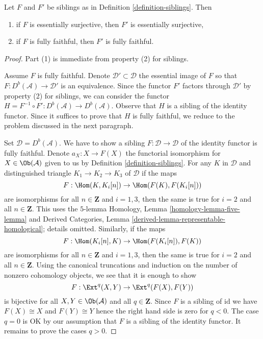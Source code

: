 \begin{lemma}
\label{lemma-sibling-faithful}
Let $F$ and $F'$ be siblings as in Definition \ref{definition-siblings}.
Then
\begin{enumerate}
\item if $F$ is essentially surjective, then $F'$ is essentially
surjective,
\item if $F$ is fully faithful, then $F'$ is fully faithful.
\end{enumerate}
\end{lemma}

\begin{proof}
Part (1) is immediate from property (2) for siblings.

\medskip\noindent
Assume $F$ is fully faithful. Denote $\mathcal{D}' \subset \mathcal{D}$
the essential image of $F$ so that $F : D^b(\mathcal{A}) \to \mathcal{D}'$
is an equivalence. Since the functor $F'$ factors through $\mathcal{D}'$
by property (2) for siblings, we can consider the functor
$H = F^{-1} \circ F' : D^b(\mathcal{A}) \to D^b(\mathcal{A})$.
Observe that $H$ is a sibling of the identity functor.
Since it suffices to prove that $H$ is fully faithful,
we reduce to the problem discussed in the next paragraph.

\medskip\noindent
Set $\mathcal{D} = D^b(\mathcal{A})$. We have to show a sibling
$F : \mathcal{D} \to \mathcal{D}$ of the identity functor is fully faithful.
Denote $a_X : X \to F(X)$ the functorial isomorphism for
$X \in \Ob(\mathcal{A})$ given to us by Definition \ref{definition-siblings}.
For any $K$ in $\mathcal{D}$ and distinguished triangle
$K_1 \to K_2 \to K_3$ of $\mathcal{D}$
if the maps
$$
F : \Hom(K, K_i[n]) \to \Hom(F(K), F(K_i[n]))
$$
are isomorphisms for all $n \in \mathbf{Z}$ and $i = 1, 3$, then the
same is true for $i = 2$ and all $n \in \mathbf{Z}$. This uses the
$5$-lemma Homology, Lemma \ref{homology-lemma-five-lemma} and
Derived Categories, Lemma \ref{derived-lemma-representable-homological};
details omitted. Similarly, if the maps
$$
F : \Hom(K_i[n], K) \to \Hom(F(K_i[n]), F(K))
$$
are isomorphisms for all $n \in \mathbf{Z}$ and $i = 1, 3$, then the
same is true for $i = 2$ and all $n \in \mathbf{Z}$. Using the canonical
truncations and induction on the number of nonzero cohomology objects,
we see that it is enough to show
$$
F : \Ext^q(X, Y) \to \Ext^q(F(X), F(Y))
$$
is bijective for all $X, Y \in \Ob(\mathcal{A})$ and all $q \in \mathbf{Z}$.
Since $F$ is a sibling of $\text{id}$ we have $F(X) \cong X$ and
$F(Y) \cong Y$ hence the right hand side is zero for $q < 0$.
The case $q = 0$ is OK by our assumption that $F$ is a sibling of
the identity functor. It remains to prove the cases $q > 0$.


\end{proof}
